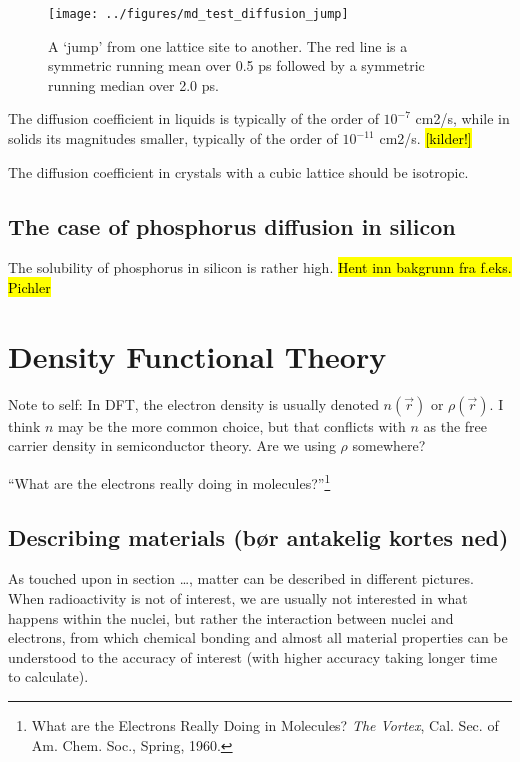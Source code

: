 \documentclass[11pt,bibliography=totoc,index=totoc]{scrbook}   %
\newcommand{\comment}[1]{\hl{#1}}
\begin{document}
\begin{figure}[htbp]
  \begin{center}
    \texttt{[image: ../figures/md\_test\_diffusion\_jump]}
  \end{center}
  \caption{A `jump' from one lattice site to another. The red line is a symmetric running mean over 0.5 ps followed by a symmetric running median over 2.0 ps.}
  \label{fig:../figures/md_test_diffusion_jump}
\end{figure}

The diffusion coefficient in liquids is typically of the order of $10^{-7}$ cm2/s,
while in solids its magnitudes smaller, typically of the order of $10^{-11}$ cm2/s. \comment{[kilder!]}


The diffusion coefficient in crystals with a cubic lattice should be isotropic.

\section{The case of phosphorus diffusion in silicon}

The solubility of phosphorus in silicon is rather high. 
\comment{Hent inn bakgrunn fra f.eks. Pichler}



\chapter{Density Functional Theory}

Note to self: In DFT, the electron density is usually denoted $n(\vec{r})$ or
$\rho(\vec{r})$. I think $n$ may be the more common choice, but that conflicts
with $n$ as the free carrier density in semiconductor theory. Are we using
$\rho$ somewhere?

``What are the electrons really doing in molecules?''\footnote{What are the
Electrons Really Doing in Molecules? \textit{The Vortex}, Cal. Sec. of
Am. Chem. Soc., Spring, 1960.}

\section{Describing materials (bør antakelig kortes ned)}

As touched upon in section \ldots, matter can be described in different pictures. When radioactivity is not of interest, we are usually not interested in what happens within the nuclei, but rather the interaction between nuclei and electrons, from which chemical bonding and almost all material properties can be understood to the accuracy of interest (with higher accuracy taking longer time to calculate).
\end{document}
